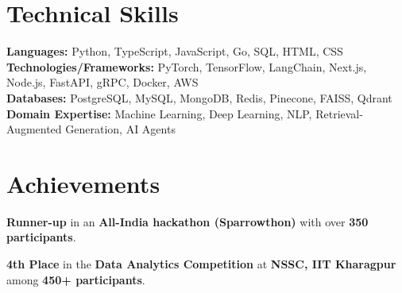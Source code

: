 \documentclass[letterpaper,11pt]{article}
\begin{document}
\section{Technical Skills}
\begin{itemize}[leftmargin=0.15in, label={}]
  \small{
    \item \textbf{Languages:} Python, TypeScript, JavaScript, Go, SQL, HTML, CSS \\
    \textbf{Technologies/Frameworks:} PyTorch, TensorFlow, LangChain, Next.js, Node.js, FastAPI, gRPC, Docker, AWS \\
    \textbf{Databases:} PostgreSQL, MySQL, MongoDB, Redis, Pinecone, FAISS, Qdrant \\
    \textbf{Domain Expertise:} Machine Learning, Deep Learning, NLP, Retrieval-Augmented Generation, AI Agents
  }
\end{itemize}

\section{Achievements}
\begin{itemize}[leftmargin=0.15in, label={}]
    \small{
      \item \textbf{Runner-up} in an \textbf{All-India hackathon (Sparrowthon)} with over \textbf{350 participants}.
      \item \textbf{4th Place} in the \textbf{Data Analytics Competition} at \textbf{NSSC, IIT Kharagpur} among \textbf{450+ participants}.
    }
\end{itemize}
\end{document}
